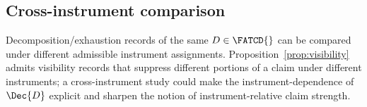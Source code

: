\subsection{Cross-instrument comparison}\label{subsec:future-cross-instrument}

Decomposition/exhaustion records of the same \(D \in \FATCD{}\) can
be compared under different admissible instrument assignments.
Proposition~\ref{prop:visibility} admits visibility records that
suppress different portions of a claim under different instruments; a
cross-instrument study could make the instrument-dependence of
\(\Dec{D}\) explicit and sharpen the notion of instrument-relative
claim strength.
